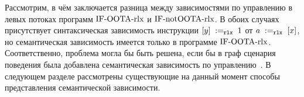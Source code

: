 Рассмотрим, в чём заключается разница между зависимостями по управлению в левых потоках программ 
${\rm IF\text{-}OOTA\text{-}rlx}$ и ${\rm IF\text{-}notOOTA\text{-}rlx}$.
В обоих случаях присутствует синтаксическая зависимость инструкции $[y] \;:=_{\mathtt{rlx}}\;1$ от
$a \;:=_{\mathtt{rlx}}\;[x]$, но семантическая зависимость имеется
только в программе ${\rm IF\text{-}OOTA\text{-}rlx}$.
Соответственно, проблема могла бы быть решена, если бы в граф сценария поведения была добавлена
семантическая зависимость по управлению~\cite{Batty-Sewell:WNote14}.
В следующем разделе рассмотрены существующие на данный момент способы представления семантической зависимости.



